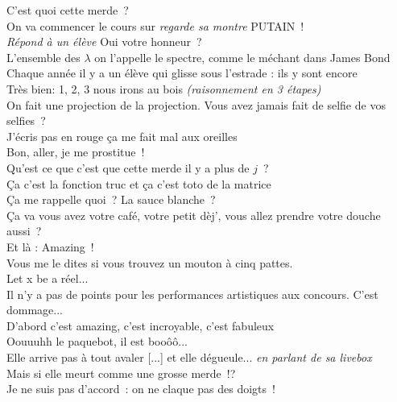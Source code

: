 \documentclass[french, a4paper, openany]{book}
\begin{document}
	\noindent \og C'est quoi cette merde~? \fg \\
	\og On va commencer le cours sur \emph{regarde sa montre} PUTAIN~! \fg \\
	\emph{Répond à un élève} \og Oui votre honneur~? \fg \\
	\og L'ensemble des $\lambda$ on l'appelle le spectre, comme le méchant dans James Bond \fg \\
	\og Chaque année il y a un élève qui glisse sous l'estrade : ils y sont encore \fg \\
	\og Très bien: 1, 2, 3 nous irons au bois \fg \emph{(raisonnement en 3 étapes)} \\
	\og On fait une projection de la projection. Vous avez jamais fait de selfie de vos selfies~? \fg \\
	\og J'écris pas en rouge ça me fait mal aux oreilles \fg \\
	\og Bon, aller, je me prostitue~! \fg \\
	\og Qu'est ce que c'est que cette merde il y a plus de $j$~? \fg \\
	\og Ça c'est la fonction truc et ça c'est toto de la matrice \fg \\
	\og Ça me rappelle quoi~? La sauce blanche~? \fg \\
	\og Ça va vous avez votre café, votre petit dèj', vous allez prendre votre douche aussi~? \fg \\
	\og Et là : Amazing~! \fg \\
	\og Vous me le dites si vous trouvez un mouton à cinq pattes. \fg \\
	\og Let x be a réel... \fg \\
	\og Il n'y a pas de points pour les performances artistiques aux concours. C'est dommage... \fg \\
	\og D'abord c'est amazing, c'est incroyable, c'est fabuleux \fg \\
	\og Oouuuhh le paquebot, il est booôô... \fg \\
	\og Elle arrive pas à tout avaler [...] et elle dégueule... \fg \emph{en parlant de sa livebox} \\
	\og Mais si elle meurt comme une grosse merde~!? \fg \\
	\og Je ne suis pas d'accord~: on ne claque pas des doigts~! \fg \\
	
\end{document}
